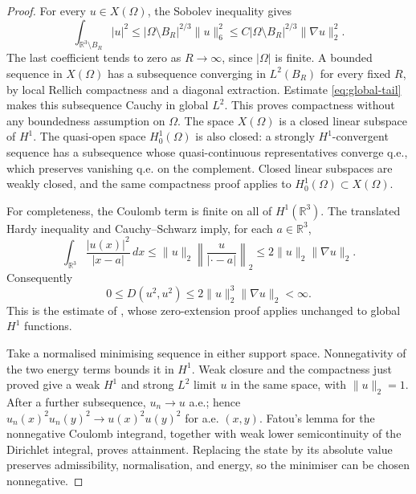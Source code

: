 \documentclass[11pt,a4paper]{article}
\theoremstyle{definition}
\theoremstyle{remark}
\begin{document}
\begin{proof}
For every $u\in X(\Omega)$, the Sobolev inequality gives
\begin{equation}
 \int_{\mathbb R^3\setminus B_R}|u|^2
 \leq |\Omega\setminus B_R|^{2/3}\|u\|_6^2
 \leq C|\Omega\setminus B_R|^{2/3}\|\nabla u\|_2^2.
 \label{eq:global-tail}
\end{equation}
The last coefficient tends to zero as $R\to\infty$, since $|\Omega|$
is finite.  A bounded sequence in $X(\Omega)$ has a subsequence
converging in $L^2(B_R)$ for every fixed $R$, by local Rellich
compactness and a diagonal extraction.  Estimate
\eqref{eq:global-tail} makes this subsequence Cauchy in global $L^2$.
This proves compactness without any boundedness assumption on
$\Omega$.  The space $X(\Omega)$ is a closed linear subspace of $H^1$.
The quasi-open space $H^1_0(\Omega)$ is also closed: a strongly
$H^1$-convergent sequence has a subsequence whose quasi-continuous
representatives converge q.e., which preserves vanishing q.e. on the
complement.  Closed linear subspaces are weakly closed, and the same
compactness proof applies to $H^1_0(\Omega)\subset X(\Omega)$.

For completeness, the Coulomb term is finite on all of $H^1(\mathbb
R^3)$.  The translated Hardy inequality and Cauchy--Schwarz imply,
for each $a\in\mathbb R^3$,
\[
 \int_{\mathbb R^3}\frac{|u(x)|^2}{|x-a|}\,dx
 \leq\|u\|_2\left\|\frac{u}{|\cdot-a|}\right\|_2
 \leq 2\|u\|_2\|\nabla u\|_2.
\]
Consequently
\begin{equation}
 0\leq D(u^2,u^2)\leq2\|u\|_2^3\|\nabla u\|_2<\infty.
 \label{eq:global-coulomb-bound}
\end{equation}
This is the estimate of \cite[Lemma~2.1, p.~1033]{MMR2025}, whose
zero-extension proof applies unchanged to global $H^1$ functions.

Take a normalised minimising sequence in either support space.
Nonnegativity of the two energy terms bounds it in $H^1$.
Weak closure and the compactness just proved give a weak $H^1$ and
strong $L^2$ limit $u$ in the same space, with $\|u\|_2=1$.
After a further subsequence, $u_n\to u$ a.e.; hence
$u_n(x)^2u_n(y)^2\to u(x)^2u(y)^2$ for a.e. $(x,y)$.
Fatou's lemma for the nonnegative Coulomb integrand, together with weak
lower semicontinuity of the Dirichlet integral, proves attainment.
Replacing the state by its absolute value preserves admissibility,
normalisation, and energy, so the minimiser can be chosen nonnegative.


\end{proof}
\end{document}
